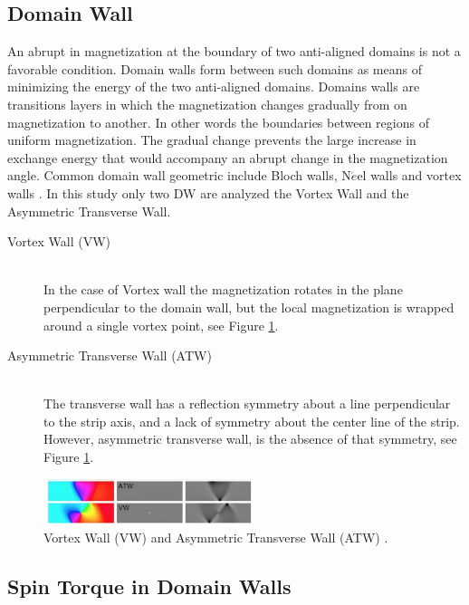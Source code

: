 \subsection{Domain Wall}

An abrupt in magnetization at the boundary of two anti-aligned domains is not a favorable condition. Domain walls form between such domains as means of minimizing the energy of the two anti-aligned domains. Domains walls are transitions layers in which the magnetization changes gradually from on magnetization to another. In other words the boundaries between regions of uniform magnetization. The gradual change prevents the large increase in exchange energy that would accompany an abrupt change in the magnetization angle. Common domain wall geometric include Bloch walls, N$\acute{e}$el walls and vortex walls \cite{spindomain}. In this study only two DW are analyzed the Vortex Wall and the Asymmetric Transverse Wall.

\begin{description}
  \item[Vortex Wall (VW)] \hfill \\
   In the case of Vortex wall the magnetization rotates in the plane perpendicular to the domain wall, but the local magnetization is wrapped around a single vortex point, see Figure \ref{fig:dw}.
   
 \item[Asymmetric Transverse Wall (ATW)] \hfill \\
 The transverse wall has a reflection symmetry about a line perpendicular to the strip axis, and a lack of symmetry about the center line of the strip. However, asymmetric transverse wall, is the absence of that symmetry, see Figure \ref{fig:dw}.
 
\end{description}

\begin{figure}[htbp]
	\centering
		\includegraphics[width=0.55\textwidth]{Figures/dw.png}
		\smallskip
	\caption[Domain Wall VW, ATW]{Vortex Wall (VW) and Asymmetric Transverse Wall (ATW) \cite{claudio}.}
	\label{fig:dw}
\end{figure}

\subsection{Spin Torque in Domain Walls}

